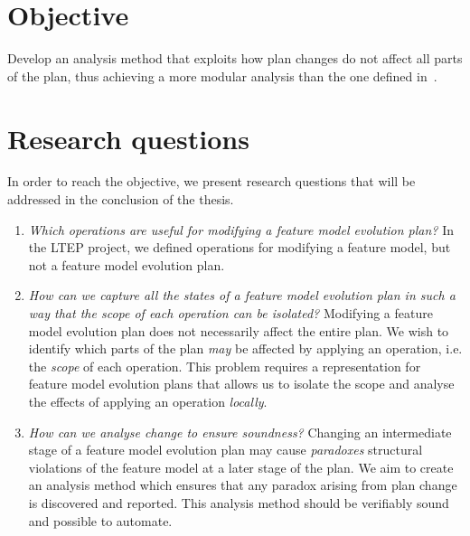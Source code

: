
\section{Objective}
\label{sec:objective}

Develop an analysis method that exploits how plan changes do not affect all parts of the plan, thus achieving a more modular analysis than the one defined in~\cite{art:consistency-preserving-evolution-planning}.

\section{Research questions}
\label{sec:research-questions}

In order to reach the objective, we present research questions that will be addressed in the conclusion of the thesis.

\begin{enumerate}[\itbf{RQ\arabic*}, itemsep=0mm]
   \item \textit{Which operations are useful for modifying a feature model evolution plan?} In the LTEP project, we defined operations for modifying a feature model, but not a feature model evolution plan. \label{rq1}
   \item \textit{How can we capture all the states of a feature model evolution plan in such a way that the scope of each operation can be isolated?} Modifying a feature model evolution plan does not necessarily affect the entire plan. We wish to identify which parts of the plan \emph{may} be affected by applying an operation, i.e. the \emph{scope} of each operation. This problem requires a representation for feature model evolution plans that allows us to isolate the scope and analyse the effects of applying an operation \emph{locally}. \label{rq2}
   \item \textit{How can we analyse change to ensure soundness?} 
      Changing an intermediate stage of a feature model evolution plan may cause \emph{paradoxes} \textemdash{} structural violations of the feature model \textemdash{} at a later stage of the plan. 
      We aim to create an analysis method which ensures that any paradox arising from plan change is discovered and reported. This analysis method should be verifiably sound and possible to automate. \label{rq3}
\end{enumerate}

